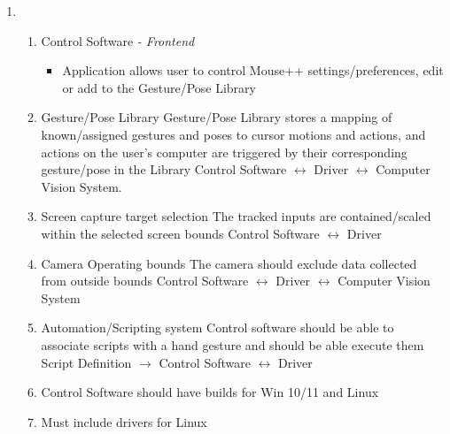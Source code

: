 \documentclass{article}
\newlength\tindent
\begin{document}
\begin{enumerate}[label=\textbf{P\arabic*},leftmargin=\tindent,start=0]
\item ~
    \begin{enumerate}[label=Req \arabic*.,leftmargin=\tindent,align=left,labelwidth=\tindent]
    \item Control Software \textit{- Frontend}
        \begin{itemize}
        \item Application allows user to control Mouse++ settings/preferences, edit or add to the Gesture/Pose Library
        \end{itemize}
    \item Gesture/Pose Library
        {Gesture/Pose Library stores a mapping of known/assigned gestures and poses to cursor motions and actions, and actions on the user's computer are triggered by their corresponding gesture/pose in the Library}
        {Control Software $\leftrightarrow$ Driver $\leftrightarrow$ Computer Vision System.}
    \item Screen capture target selection
        {The tracked inputs are contained/scaled within the selected screen bounds}
        {Control Software $\leftrightarrow$ Driver}
    \item Camera Operating bounds
        {The camera should exclude data collected from outside bounds}
        {Control Software $\leftrightarrow$ Driver $\leftrightarrow$ Computer Vision System}
    \item Automation/Scripting system
        {Control software should be able to associate scripts with a hand gesture and should be able execute them}
        {Script Definition $\to$ Control Software $\leftrightarrow$ Driver}
    \item Control Software should have builds for Win 10/11 and Linux
    \item Must include drivers for Linux
    \end{enumerate}


\end{enumerate}
\end{document}
